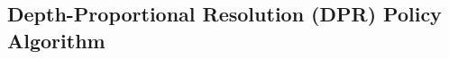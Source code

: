 \subsection{Depth-Proportional Resolution (DPR) Policy Algorithm}
\label{sec:depth-proportional-resolution-algo}







